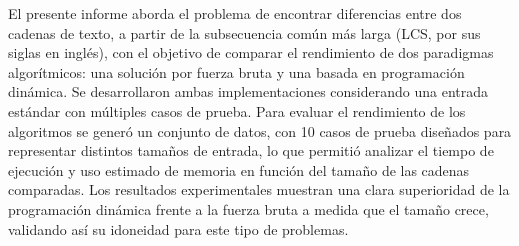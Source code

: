El presente informe aborda el problema de encontrar diferencias entre dos cadenas de texto, a partir de la subsecuencia común más larga (LCS, por sus siglas en inglés), con el objetivo de comparar el rendimiento de dos paradigmas algorítmicos: una solución por fuerza bruta y una basada en programación dinámica. Se desarrollaron ambas implementaciones considerando una entrada estándar con múltiples casos de prueba. Para evaluar el rendimiento de los algoritmos se generó un conjunto de datos, con 10 casos de prueba diseñados para representar distintos tamaños de entrada, lo que permitió analizar el tiempo de ejecución y uso estimado de memoria en función del tamaño de las cadenas comparadas. Los resultados experimentales muestran una clara superioridad de la programación dinámica frente a la fuerza bruta a medida que el tamaño crece, validando así su idoneidad para este tipo de problemas.